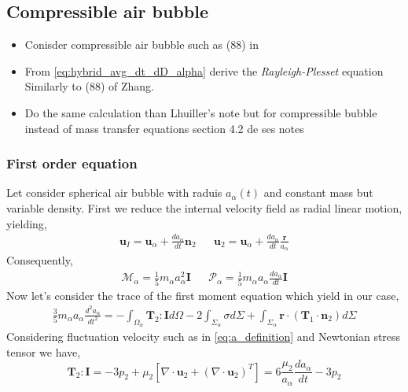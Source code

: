 \subsection{Compressible air bubble}
\begin{itemize}
    \item Conisder compressible air bubble such as (88) in \citet{zhang1994ensemble}
    \item From \ref{eq:hybrid_avg_dt_dD_alpha} derive the \textit{Rayleigh-Plesset} equation Similarly to (88) of Zhang. 
    \item Do the same calculation than Lhuiller's note but for compressible bubble instead of mass transfer equations section 4.2 de ses notes
\end{itemize}

\subsubsection{First order equation}
Let consider spherical air bubble with raduis $a_\alpha(t)$ and constant mass but variable density.
First we reduce the internal velocity field as radial linear motion, yielding, 
\begin{align}
    \textbf{u}_I = \textbf{u}_\alpha + \frac{d a_\alpha}{dt} \textbf{n}_2
    &&
    \textbf{u}_2 = \textbf{u}_\alpha + \frac{d a_\alpha}{dt} \frac{\textbf{r}}{a_\alpha} 
    \label{eq:a_definition}
\end{align}
Consequently, 
\begin{align*}
    \mathcal{M}_\alpha 
    = \frac{1}{5} m_\alpha a_\alpha^2 \textbf{I}
    &&
    \mathcal{P}_\alpha 
    = \frac{1}{5} m_\alpha a_\alpha \frac{d a_\alpha}{dt} \textbf{I}
\end{align*}
Now let's consider the trace of the first moment equation which yield in our case,
\begin{multline}
    \frac{3}{5}
    m_\alpha 
    a_\alpha
    \frac{d^2 a_\alpha}{dt^2}
    = - \int_{\Omega_\alpha} 
         \mathbf{T}_2 : \textbf{I}
         d\Omega
        - 2\int_{\Sigma_\alpha} \sigma d\Sigma
        + \int_{\Sigma_\alpha} \textbf{r}\cdot(\textbf{T}_1\cdot\textbf{n}_2) d\Sigma
\end{multline}
Considering fluctuation velocity such as in \ref{eq:a_definition} and Newtonian stress tensor we have, 
\begin{equation*}
    \mathbf{T}_2 : \textbf{I}
    = 
    -  3p_2
    + \mu_2 \left[
        \nabla \cdot \textbf{u}_2 
        + (\nabla \cdot \textbf{u}_2 )^T
    \right]
    = 
    6\frac{\mu_2}{a_\alpha}\frac{d a_\alpha}{dt} 
    -3 p_2
\end{equation*}
